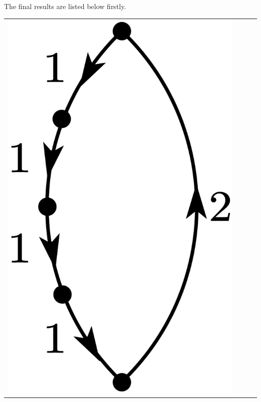 \documentclass[a4paper]{book}
\newcounter{solution}[chapter]
\begin{document}
	\begin{solution}
	 
	The final results are listed below firstly. 
	
	\begin{center}
	\begin{tabular}{cccc}
	
		\begin{minipage}{0.22\linewidth}
		\centering
		\includegraphics[scale=1.0,trim=0 -4 0 -4]{./pictures/6.01/1.png}
		\captionof*{figure}{$\displaystyle (-1)^{4+1} \frac{ V^3_{11} V_{12} V_{21} }{ ( E^{(0)}_1 - E^{(0)}_2)^4 }$}
		\end{minipage} &
		

\end{tabular}
\end{center}
\end{solution}
\end{document}
